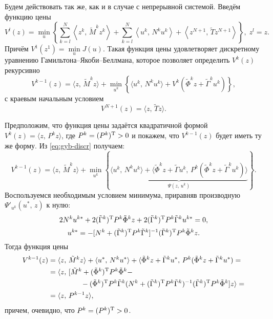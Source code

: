 Будем действовать так же, как и в случае с непрерывной системой. Введём функцию цены 
$$
V^l(z) = \min\limits_u\left\{
        \sum\limits_{k = l}^{N}
        \left
        \langle
z^k,\,
{\tilde M^k}
z^k
        \right
        \rangle
        +
        \sum\limits_{k = l}^{N}
        \left
        \langle
u^k,\,
N^k
u^k
        \right
        \rangle
        +
        \left
        \langle
z^{N+1},\,
{\tilde T}
z^{N+1}
        \right
        \rangle
\right\},
\;
z^l = z.
$$
Причём $V^1(z^1) = \min\limits_u J(u)$. Такая функция цены удовлетворяет дискретному уравнению Гамильтона--Якоби--Беллмана, которое позволяет определить $V^k(z)$ рекурсивно
\begin{equation}\label{eq:gyb-discr}
V^{k-1}(z) = \langle z,\,\tilde M^k z\rangle
+
\min\limits_{u^k}
\left\{
\langle
u^k,\,N^k u^k
\rangle
+
V^{k}(\tilde\Phi^k z + \tilde\Gamma^k u^k)
\right\},
\end{equation}
с краевым начальным условием
\begin{equation}\label{eq:gyb-discr-1}
        V^{N+1}(z)
        =
        \langle z,\,\tilde T z\rangle.
\end{equation}

Предположим, что функция цены задаётся квадратичной формой $V^{k}(z) = \langle z,\, P^{k} z\rangle$, где $P^{k} = (P^{k})^\mathrm{T} > 0$ и покажем, что $V^{k-1}(z)$ будет иметь ту же форму. Из \eqref{eq:gyb-discr} получаем:
$$
V^{k-1}(z) = \langle z,\, \tilde M^k z \rangle + \min\limits_{u^k}\left\{\underbrace{
\langle u^k,\,N^k u^k \rangle
+
\langle
\tilde\Phi^k z + \tilde\Gamma u^k,\,
P^{k}(\tilde\Phi^k z + \tilde\Gamma^k u^k)
\rangle}_{\Psi(z,\,u^k)}
\right\}.
$$
Воспользуемся необходимым условием минимума, приравняв производную 
$\Psi'_{u^k}(u^*,\,z)$ к нулю:
$$
        2 N^k u^{k*} + 2(\tilde\Gamma^k)^\mathrm{T} P^k\tilde\Phi^k z + 2(\tilde\Gamma^k)^\mathrm{T} P^k \tilde \Gamma ^ku^{k*} = 0,
$$
\begin{equation}\label{eq:opt-discr}
        u^{k*} = -[N^k + (\tilde\Gamma^k)^\mathrm{T} P^{k}\tilde\Gamma^k]^{-1}(\tilde\Gamma^k)^\mathrm{T} P^{k} \tilde\Phi^k z.
\end{equation}
Тогда функция цены
\begin{align*}
V^{k-1}(z) &=
\langle
z,\,\tilde M^k z
\rangle
+
\langle
u^*,\,N^ku^*
\rangle
+
\langle
\tilde\Phi^k z + \tilde\Gamma^k u^*
,\,P^{k}(\tilde\Phi^k z + \tilde\Gamma^k u^*) =\\
&=
\langle
z,\,
[\tilde M^k
+
(\tilde\Phi^k)^\mathrm{T} P^k \tilde\Phi^k
-\\&\qquad\qquad\;\;-
(\tilde\Phi^k)^\mathrm{T} P^k \tilde\Gamma^k (N^k + (\tilde\Gamma^k)^\mathrm{T} P^k \tilde\Gamma^k)^{-1} (\tilde\Gamma^k)^\mathrm{T} P^k \tilde\Phi^k
]z\rangle = \\
&=
\langle z,\, P^{k-1} z \rangle,
\end{align*}
причем, очевидно, что $P^k = (P^k)^\mathrm{T} > 0$.

